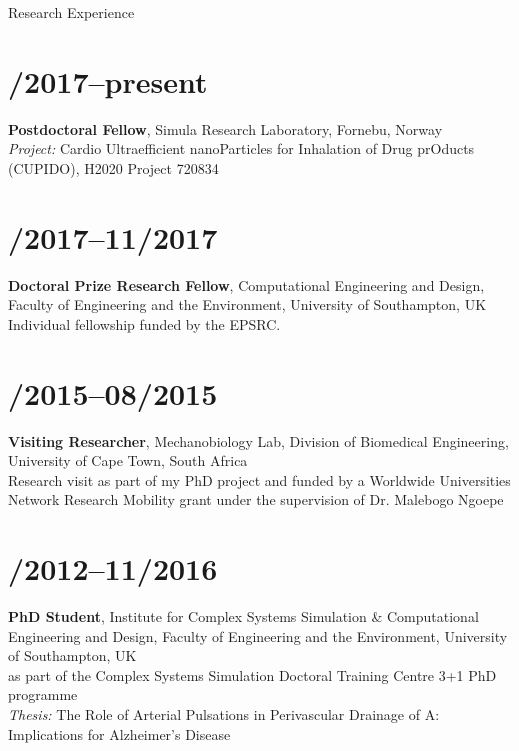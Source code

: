 \documentclass[margin,line,10pt]{res}
\begin{document}
\begin{resume}
\vspace*{-.2in}

{\sc Research Experience}\\
\vspace*{-.35in}
\section{/2017--present}{\bf Postdoctoral Fellow}, Simula Research Laboratory, Fornebu, Norway\\
{\em Project:} Cardio Ultraefficient nanoParticles for Inhalation of Drug prOducts (CUPIDO), H2020 Project 720834\\
\vspace*{-.35in}
\section{/2017--11/2017}{\bf Doctoral Prize Research Fellow}, Computational Engineering and Design, Faculty of Engineering and the Environment, University of Southampton, UK\\
Individual fellowship funded by the EPSRC.\\
\vspace*{-.35in}
\section{/2015--08/2015}{\bf Visiting Researcher}, Mechanobiology Lab, Division of Biomedical Engineering, University of Cape Town, South Africa\\
Research visit as part of my PhD project and funded by a Worldwide Universities Network Research Mobility grant under the supervision of Dr. Malebogo Ngoepe\\
\vspace*{-.35in}
\section{/2012--11/2016}{\bf PhD Student}, Institute for Complex Systems Simulation \& Computational Engineering and Design, Faculty of Engineering and the Environment, University of Southampton, UK\\
as part of the Complex Systems Simulation Doctoral Training Centre 3+1 PhD programme\\
{\em Thesis:} The Role of Arterial Pulsations in Perivascular Drainage of A\textbeta: Implications for Alzheimer's Disease\\    
\vspace*{-.35in}        

\end{resume}
\end{document}
